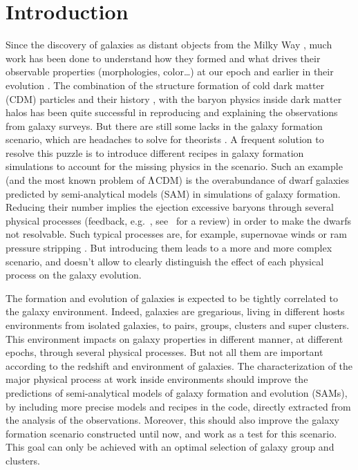 \chapter{Introduction}

\minitoc%

Since the discovery of galaxies as distant objects from the Milky Way
\citep{Hubble+29}, much work has been done to understand how they formed and
what drives their observable properties (morphologies, color\ldots) at our
epoch and earlier in their evolution \citep{Benson+10,Silk+12,Silk+13}. The
combination of the structure formation of cold dark matter (CDM) particles and
their history \citep{Zentner+07}, with the baryon physics inside dark matter
halos \citep{Kravtsov+12} has been quite successful in reproducing and
explaining the observations from galaxy surveys. But there are still some lacks
in the galaxy formation scenario, which are headaches to solve for theorists
\citep{Weinmann+12}. A frequent solution to resolve this puzzle is to introduce
different recipes in galaxy formation simulations to account for the missing
physics in the scenario.
%
Such an example (and the most known problem of $\rm \Lambda$CDM) is the
overabundance of dwarf galaxies predicted by semi-analytical models (SAM) in
simulations of galaxy formation. Reducing their number implies the ejection
excessive baryons through several physical processes (feedback, e.g.\
\citet{Brooks+13}, see~\cite{Silk+12} for a review) in order to make the dwarfs
not resolvable. Such typical processes are, for example, supernovae winds
\citep{Hirschmann+13, Dekel+86} or ram pressure stripping \citep{Gunn+72}. But
introducing them leads to a more and more complex scenario, and doesn't allow
to clearly distinguish the effect of each physical process on the galaxy
evolution.

The formation and evolution of galaxies is expected to be tightly correlated to
the galaxy environment. Indeed, galaxies are gregarious, living in different
hosts environments from isolated galaxies, to pairs, groups, clusters and super
clusters. This environment impacts on galaxy properties in different manner, at
different epochs, through several physical processes. But not all them are
important according to the redshift and environment of galaxies. The
characterization of the major physical process at work inside environments
should improve the predictions of semi-analytical models of galaxy formation
and evolution (SAMs), by including more precise models and recipes in the code,
directly extracted from the analysis of the observations. Moreover, this should
also improve the galaxy formation scenario constructed until now, and work as a
test for this scenario. This goal can only be achieved with an optimal
selection of galaxy group and clusters.

